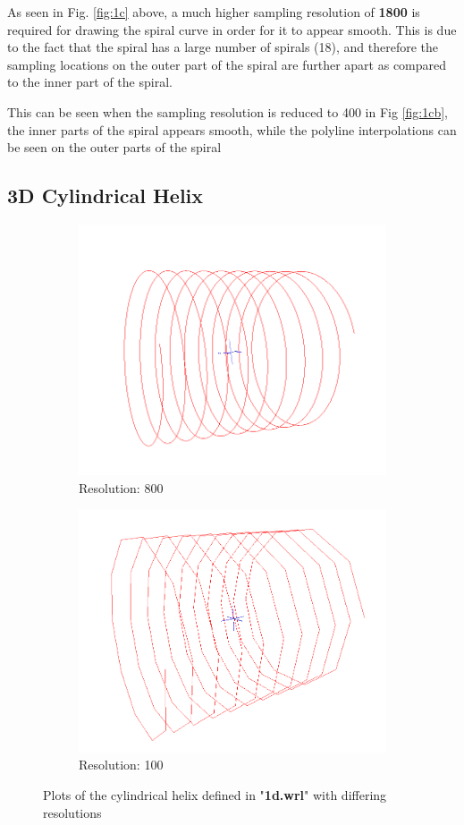 \documentclass[acmlarge,nonacm=true]{acmart}
\begin{document}
As seen in Fig. \ref{fig:1c} above, a much higher sampling resolution of \textbf{1800} is required for drawing the spiral curve in order for
it to appear smooth. This is due to the fact that the spiral has a large number of spirals (18), and therefore the sampling 
locations on the outer part of the spiral are further apart as compared to the inner part of the spiral. 

This can be seen when the sampling resolution is reduced to 400 in Fig \ref{fig:1cb}, the inner parts of the spiral appears smooth, while 
the polyline interpolations can be seen on the outer parts of the spiral

\subsection{3D Cylindrical Helix}
\begin{figure}[H]
	\begin{subfigure}{.4\textwidth}
	  \centering
	  \includegraphics[width=.8\linewidth]{fig/1d800}
	  \caption{Resolution: 800}
	\end{subfigure}%
	\begin{subfigure}{.4\textwidth}
	  \centering
	  \includegraphics[width=.8\linewidth]{fig/1d100}
	  \caption{Resolution: 100}
	\end{subfigure}
	\caption{Plots of the cylindrical helix defined in "\textbf{1d.wrl}" with differing resolutions}
	\label{fig:1d}
\end{figure}
\end{document}
